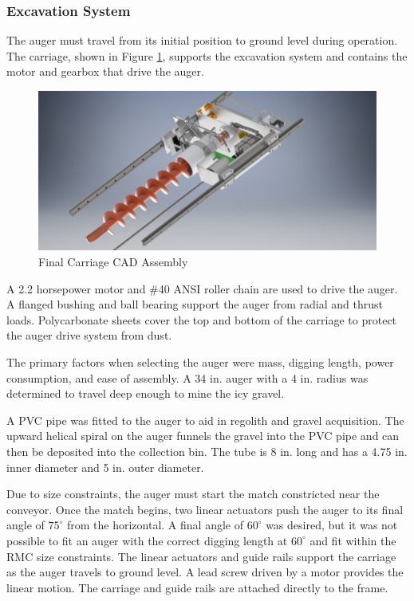 \documentclass[class=article, crop=false]{standalone}
\begin{document}
	
	\subsubsection{Excavation System}
	
	The auger must travel from its initial position to ground level during operation. The carriage, shown in Figure \ref{fig:carriage-cad}, supports the excavation system and contains the motor and gearbox that drive the auger. 
	
	\FloatBarrier
	\begin{figure}[h]
	\centering
	 \includegraphics[width=0.8\linewidth]{09_Figures/carriage-cad.jpg}
	 \caption{Final Carriage CAD Assembly}
	 \label{fig:carriage-cad}
	\end{figure}
	\FloatBarrier
	
	A 2.2 horsepower motor and \#40 ANSI roller chain are used to drive the auger.  A flanged bushing and ball bearing support the auger from radial and thrust loads. Polycarbonate sheets cover the top and bottom of the carriage to protect the auger drive system from dust.
	
	The primary factors when selecting the auger were mass, digging length, power consumption, and ease of assembly. A 34 in. auger with a 4 in. radius was determined to travel deep enough to mine the icy gravel. 
	
	A PVC pipe was fitted to the auger to aid in regolith and gravel acquisition. The upward helical spiral on the auger funnels the gravel into the PVC pipe and can then be deposited into the collection bin. The tube is 8 in. long and has a 4.75 in. inner diameter and 5 in. outer diameter. 
	
	Due to size constraints, the auger must start the match constricted near the conveyor. Once the match begins, two linear actuators push the auger to its final angle of $75^\circ$ from the horizontal. A final angle of $60^{\circ}$ was desired, but it was not possible to fit an auger with the correct digging length at $60^\circ$ and fit within the RMC size constraints. The linear actuators and guide rails support the carriage as the auger travels to ground level. A lead screw driven by a motor provides the linear motion. The carriage and guide rails are attached directly to the frame.
	
\end{document}
